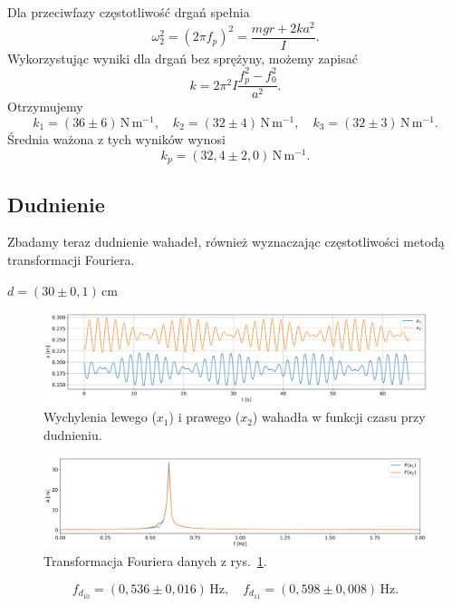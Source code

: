\documentclass[12pt]{article}
\begin{document}
Dla przeciwfazy częstotliwość drgań spełnia\cite{skrypt}
\[
	\omega_2^2 = (2\pi f_p)^2 = \frac{mgr + 2ka^2}{I}.
\]
Wykorzystując wyniki dla drgań bez sprężyny, możemy zapisać
\[
	k = 2\pi^2 I \frac{f_p^2 - f_0^2}{a^2}.
\]
Otrzymujemy
\[
	k_1 = (36 \pm 6)\,\mathrm{N\,m^{-1}}, \quad
	k_2 = (32 \pm 4)\,\mathrm{N\,m^{-1}}, \quad
	k_3 = (32 \pm 3)\,\mathrm{N\,m^{-1}}.
\]
Średnia ważona z tych wyników wynosi
\[
	k_p = (32{,}4 \pm 2{,}0)\,\mathrm{N\,m^{-1}}.
\]

\subsection{Dudnienie}
Zbadamy teraz dudnienie wahadeł, również wyznaczając częstotliwości metodą transformacji Fouriera.

\(d = (30 \pm 0{,}1)\,\mathrm{cm}\)
\begin{figure}[H]
	\centering
	\includegraphics[width=\linewidth]{beats_1}
	\caption{Wychylenia lewego (\(x_1\)) i prawego (\(x_2\)) wahadła w funkcji czasu przy dudnieniu.}
	\label{fig:beats_0}
\end{figure}
\begin{figure}[H]
	\centering
	\includegraphics[width=\linewidth]{counterphase_1_fft}
	\caption{Transformacja Fouriera danych z rys.~\ref{fig:beats_0}.}
	\label{fig:coutner_phase_0_fft}
\end{figure}
\[
	f_{d_{10}} = (0{,}536 \pm 0{,}016)\,\mathrm{Hz}, \quad
	f_{d_{11}} = (0{,}598 \pm 0{,}008)\,\mathrm{Hz}.
\]

\newpage
\end{document}
